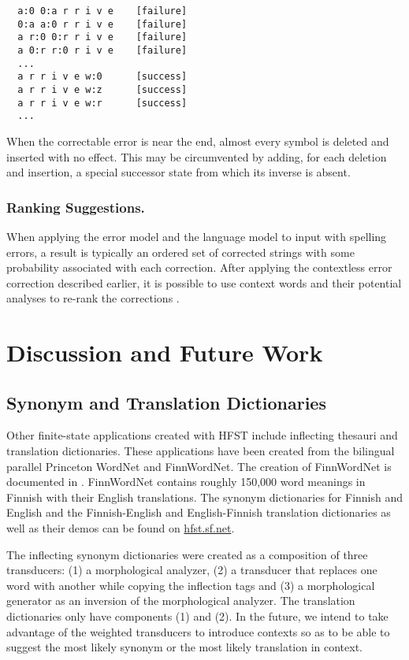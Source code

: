 \documentclass[draft]{llncs}
\begin{document}
{\footnotesize
\begin{verbatim}
  a:0 0:a r r i v e    [failure]
  0:a a:0 r r i v e    [failure]
  a r:0 0:r r i v e    [failure]
  a 0:r r:0 r i v e    [failure]
  ...
  a r r i v e w:0      [success]
  a r r i v e w:z      [success]
  a r r i v e w:r      [success]
  ...
\end{verbatim}
}

When the correctable error is near the end, almost every symbol is deleted and
inserted with no effect. This may be circumvented by adding, for each deletion
and insertion, a special successor state from which its inverse is absent.

\subsubsection{Ranking Suggestions.}

When applying the error model and the language model to input with spelling errors,
a result is typically an ordered set of corrected strings with some probability
associated with each correction. After applying the contextless error correction
described earlier, it is possible to use context words and their potential
analyses to re-rank the corrections \cite{pirinen/2012/cicling}.


\section{Discussion and Future Work}\label{Discussion}

\subsection{Synonym and Translation Dictionaries}

Other finite-state applications created with HFST include inflecting thesauri and translation dictionaries.
These applications have been created from the bilingual parallel Princeton WordNet and FinnWordNet. 
The creation of FinnWordNet is documented in \cite{linden/2010}. FinnWordNet contains roughly 150,000 
word meanings in Finnish with their English translations. The synonym dictionaries for Finnish and English and the Finnish-English and English-Finnish translation dictionaries as well as their demos can be found on \url{hfst.sf.net}.

The inflecting synonym dictionaries were created as a composition of three transducers: (1) a morphological analyzer, (2) a transducer that replaces one word with another while copying the inflection tags and (3) a morphological generator as an inversion of the morphological analyzer. The translation dictionaries only have components (1) and (2). In the future, we intend to take advantage of the weighted transducers to introduce contexts so as to be able to suggest the most likely synonym or the most likely translation in context.
\end{document}
